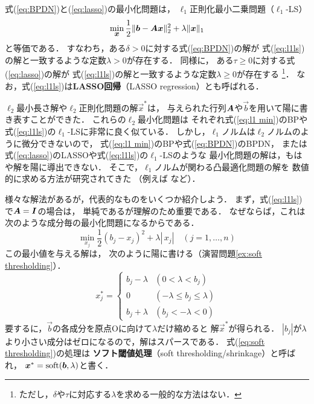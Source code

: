 式(\ref{eq:BPDN})と(\ref{eq:lasso})の最小化問題は，
$\ell_1$正則化最小二乗問題（$\ell_1$-LS）
\begin{equation}
 \min_{\small\mbox{\boldmath $x$}} \frac{1}{2}\|\mbox{\boldmath $b$}-\mbox{\boldmath $A$}\mbox{\boldmath $x$}\|_2^2+\lambda \|\mbox{\boldmath $x$}\|_1
\label{eq:l1ls}
\end{equation}
と等価である．
すなわち，ある$\delta>0$に対する式(\ref{eq:BPDN})の解が
式(\ref{eq:l1ls})の解と一致するような定数$\lambda>0$が存在する．
同様に， ある$\tau\geq 0$に対する式(\ref{eq:lasso})の解が
式(\ref{eq:l1ls})の解と一致するような定数$\lambda\geq 0$が存在する\cite{Figueiredo07}%
\footnote{ただし，$\delta$や$\tau$に対応する$\lambda$を求める一般的な方法はない．}．
なお，式(\ref{eq:l1ls})は{\bf LASSO回帰}（LASSO regression）とも呼ばれる．


$\ell_2$最小長さ解や$\ell_2$正則化問題の解$\vec x^*$は，
与えられた行列$\mbox{\boldmath $A$}$や$\vec b$を用いて陽に書き表すことができた．
これらの$\ell_2$最小化問題は
それぞれ式(\ref{eq:l1 min})のBPや式(\ref{eq:l1ls})の$\ell_1$-LSに非常に良く似ている．
しかし，$\ell_1$ノルムは$\ell_2$ノルムのように微分できないので，
式(\ref{eq:l1 min})のBPや式(\ref{eq:BPDN})のBPDN，
または式(\ref{eq:lasso})のLASSOや式(\ref{eq:l1ls})の$\ell_1$-LSのような
最小化問題の解は，もはや解を陽に導出できない．
%
そこで，$\ell_1$ノルムが関わる凸最適化問題の解を
数値的に求める方法が研究されてきた
（例えば\cite{Donoho95,Tibshirani96,Chen98}
\cite{Figueiredo07,Kim07,SJWright09,Tomioka09}など）．





様々な解法があるが，代表的なものをいくつか紹介しよう．
まず，式(\ref{eq:l1ls})で$\mbox{\boldmath $A$}=\mbox{\boldmath $I$}$の場合は，
単純であるが理解のため重要である．
なぜならば，これは次のような成分毎の最小化問題になるからである．
\begin{equation}
 \min_{x_j}\frac{1}{2}(b_j-x_j)^2+\lambda|\,x_j|\quad (j=1,\dots,n)
\label{eq:proximity l1}
\end{equation}
この最小値を与える解は，
次のように陽に書ける（演習問題\ref{ex:soft thresholding}）．
\begin{equation}
x_j^*=\left\{\begin{array}{cl}
b_j-\lambda & (0<\lambda<b_j)\\
0 & (-\lambda\leq b_j\leq\lambda)\\
b_j+\lambda & (b_j<-\lambda<0)
\end{array}\right.
\label{eq:soft thresholding}
\end{equation}
要するに，$\vec b$の各成分を原点Oに向けて$\lambda$だけ縮めると
解$\vec x^*$が得られる．
$|b_j|$が$\lambda$より小さい成分はゼロになるので，解はスパースである．
式(\ref{eq:soft thresholding})の処理は
{\bf ソフト閾値処理}（soft thresholding/shrinkage）\cite{Donoho95}と呼ばれ，
$\mbox{\boldmath $x$}^*=\mathop{\textrm{soft}}\nolimits(\mbox{\boldmath $b$},\lambda)$と書く．


